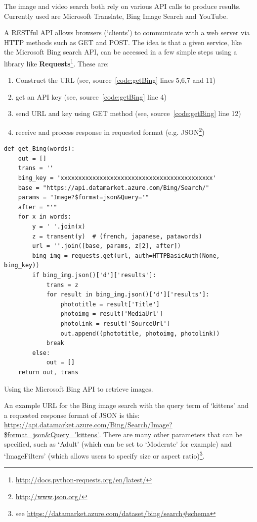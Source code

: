 The image and video search both rely on various \ac{API} calls to produce results. Currently used are Microsoft Translate, Bing Image Search and YouTube.

A \acs{REST}ful \ac{API} allows browsers (`clients') to communicate with a web server via \acs{HTTP} methods such as GET and POST. The idea is that a given service, like the Microsoft Bing search \ac{API}, can be accessed in a few simple steps using a library like \textbf{Requests}\footnote{\url{http://docs.python-requests.org/en/latest/}}. These are:

\begin{enumerate}
  \item Construct the \ac{URL} (see, source~\ref{code:getBing} lines 5,6,7 and 11)
  \item get an \ac{API} key (see, source~\ref{code:getBing} line 4)
  \item send \ac{URL} and key using GET method (see, source~\ref{code:getBing} line 12)
  \item receive and process response in requested format (e.g. \ac{JSON}\footnote{\url{http://www.json.org/}})
\end{enumerate}

\begin{listing}
  \begin{verbatim}
def get_Bing(words):
    out = []
    trans = ''
    bing_key = 'xxxxxxxxxxxxxxxxxxxxxxxxxxxxxxxxxxxxxxxxxxx'
    base = "https://api.datamarket.azure.com/Bing/Search/"
    params = "Image?$format=json&Query='"
    after = "'"
    for x in words:
        y = ' '.join(x)
        z = transent(y)  # (french, japanese, patawords)
        url = ''.join([base, params, z[2], after])
        bing_img = requests.get(url, auth=HTTPBasicAuth(None, bing_key))
        if bing_img.json()['d']['results']:
            trans = z
            for result in bing_img.json()['d']['results']:
                phototitle = result['Title']
                photoimg = result['MediaUrl']
                photolink = result['SourceUrl']
                out.append((phototitle, photoimg, photolink))
            break
        else:
            out = []
    return out, trans
  \end{verbatim}
\caption{Using the Microsoft Bing API to retrieve images.}
\label{code:getBing}
\end{listing}

An example \ac{URL} for the Bing image search with the query term of `kittens' and a requested response format of \ac{JSON} is this:
\url{https://api.datamarket.azure.com/Bing/Search/Image?$format=json&Query='kittens'}. There are many other parameters that can be specified, such as `Adult' (which can be set to `Moderate' for example) and `ImageFilters' (which allows users to specify size or aspect ratio)\footnote{see \url{https://datamarket.azure.com/dataset/bing/search\#schema}}.

